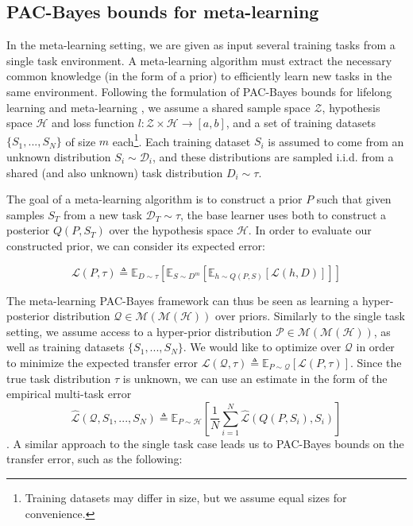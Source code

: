 \documentclass{article}
\theoremstyle{definition}
\newcommand{\Expect}[2]{\mathbb{E}_{#1}\left [#2 \right ]}
\begin{document}
\subsection{PAC-Bayes bounds for meta-learning}

In the meta-learning setting, we are given as input several training tasks from a single task environment. A meta-learning algorithm must extract the necessary common knowledge (in the form of a prior) to efficiently learn new tasks in the same environment. Following the formulation of PAC-Bayes bounds for lifelong learning \citep{Pentina2014} and meta-learning \citep{Amit2018}, we assume a shared sample space $\mathcal{Z}$, hypothesis space $\mathcal{H}$ and loss function $l:\mathcal{Z}\times \mathcal{H}\rightarrow [a,b]$, and a set of training datasets $\{S_1,...,S_N\}$ of size $m$ each\footnote{Training datasets may differ in size, but we assume equal sizes for convenience.}. Each training dataset $S_i$ is assumed to come from an unknown distribution $S_i\sim \mathcal{D}_i$, and these distributions are sampled i.i.d. from a shared (and also unknown) task distribution $D_i\sim \tau$.

The goal of a meta-learning algorithm is to construct a prior $P$ such that given samples $S_T$ from a new task $\mathcal{D}_T\sim \tau$, the base learner uses both to construct a posterior $Q(P, S_T)$ over the hypothesis space $\mathcal{H}$. In order to evaluate our constructed prior, we can consider its expected error:

$$\mathcal{L}(P, \tau)\triangleq \Expect{D\sim \tau}{\Expect{S\sim D^m}{\Expect{h\sim Q(P, S)}{\mathcal{L}(h, D)}}}$$

The meta-learning PAC-Bayes framework can thus be seen as learning a hyper-posterior distribution $\mathcal{Q}\in \mathcal{M}(\mathcal{M}(\mathcal{H}))$ over priors. Similarly to the single task setting, we assume access to a hyper-prior distribution $\mathcal{P}\in \mathcal{M}(\mathcal{M}(\mathcal{H}))$, as well as training datasets $\{S_1,...,S_N\}$.
We would like to optimize over $\mathcal{Q}$ in order to minimize the expected transfer error $\mathcal{L}(\mathcal{Q}, \tau) \triangleq \Expect{P\sim \mathcal{Q}}{\mathcal{L}(P, \tau)}$.
Since the true task distribution $\tau$ is unknown, we can use an estimate in the form of the empirical multi-task error $$\hat{\mathcal{L}}(\mathcal{Q}, S_1,...,S_N)\triangleq \Expect{P\sim \mathcal{H}}{\frac{1}{N}\sum_{i=1}^{N}\hat{\mathcal{L}}(Q(P, S_i), S_i)}$$. A similar approach to the single task case leads us to PAC-Bayes bounds on the transfer error, such as the following:
\end{document}
